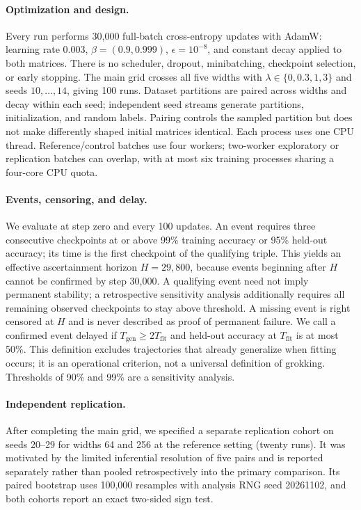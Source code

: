 \documentclass{article}
\begin{document}
\paragraph{Optimization and design.}
Every run performs 30,000 full-batch cross-entropy updates with AdamW: learning rate $0.003$, $\beta=(0.9,0.999)$, $\epsilon=10^{-8}$, and constant decay applied to both matrices. There is no scheduler, dropout, minibatching, checkpoint selection, or early stopping. The main grid crosses all five widths with $\lambda\in\{0,0.3,1,3\}$ and seeds $10,\ldots,14$, giving 100 runs. Dataset partitions are paired across widths and decay within each seed; independent seed streams generate partitions, initialization, and random labels. Pairing controls the sampled partition but does not make differently shaped initial matrices identical. Each process uses one CPU thread. Reference/control batches use four workers; two-worker exploratory or replication batches can overlap, with at most six training processes sharing a four-core CPU quota.

\paragraph{Events, censoring, and delay.}
We evaluate at step zero and every 100 updates. An event requires three consecutive checkpoints at or above 99\% training accuracy or 95\% held-out accuracy; its time is the first checkpoint of the qualifying triple. This yields an effective ascertainment horizon $H=29{,}800$, because events beginning after $H$ cannot be confirmed by step 30,000. A qualifying event need not imply permanent stability; a retrospective sensitivity analysis additionally requires all remaining observed checkpoints to stay above threshold. A missing event is right censored at $H$ and is never described as proof of permanent failure. We call a confirmed event delayed if $T_{\mathrm{gen}}\ge2T_{\mathrm{fit}}$ and held-out accuracy at $T_{\mathrm{fit}}$ is at most 50\%. This definition excludes trajectories that already generalize when fitting occurs; it is an operational criterion, not a universal definition of grokking. Thresholds of 90\% and 99\% are a sensitivity analysis.

\paragraph{Independent replication.}
After completing the main grid, we specified a separate replication cohort on seeds 20--29 for widths 64 and 256 at the reference setting (twenty runs). It was motivated by the limited inferential resolution of five pairs and is reported separately rather than pooled retrospectively into the primary comparison. Its paired bootstrap uses 100,000 resamples with analysis RNG seed 20261102, and both cohorts report an exact two-sided sign test.
\end{document}
